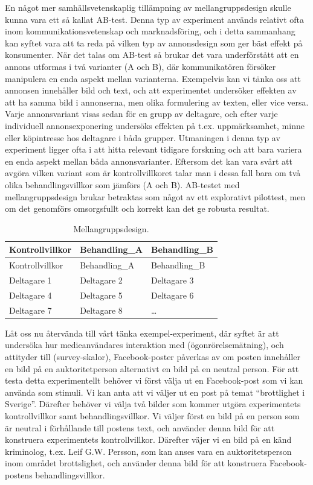 \documentclass[
]{book}
\begin{document}
En något mer samhällsvetenskaplig tillämpning av mellangruppsdesign skulle kunna vara ett så kallat AB-test. Denna typ av experiment används relativt ofta inom kommunikationsvetenskap och marknadsföring, och i detta sammanhang kan syftet vara att ta reda på vilken typ av annonsdesign som ger bäst effekt på konsumenter. När det talas om AB-test så brukar det vara underförstått att en annons utformas i två varianter (A och B), där kommunikatören försöker manipulera en enda aspekt mellan varianterna. Exempelvis kan vi tänka oss att annonsen innehåller bild och text, och att experimentet undersöker effekten av att ha samma bild i annonserna, men olika formulering av texten, eller vice versa. Varje annonsvariant visas sedan för en grupp av deltagare, och efter varje individuell annonsexponering undersöks effekten på t.ex. uppmärksamhet, minne eller köpintresse hos deltagare i båda grupper. Utmaningen i denna typ av experiment ligger ofta i att hitta relevant tidigare forskning och att bara variera en enda aspekt mellan båda annonsvarianter. Eftersom det kan vara svårt att avgöra vilken variant som är kontrollvillkoret talar man i dessa fall bara om två olika behandlingsvillkor som jämförs (A och B). AB-testet med mellangruppsdesign brukar betraktas som något av ett explorativt pilottest, men om det genomförs omsorgsfullt och korrekt kan det ge robusta resultat.

\begin{longtable}[]{@{}lll@{}}
\caption{\label{tab:tab-02-07-5-3-01}Mellangruppsdesign.}\tabularnewline
\toprule
Kontrollvillkor & Behandling\_A & Behandling\_B\tabularnewline
\midrule
\endfirsthead
\toprule
Kontrollvillkor & Behandling\_A & Behandling\_B\tabularnewline
\midrule
\endhead
Deltagare 1 & Deltagare 2 & Deltagare 3\tabularnewline
Deltagare 4 & Deltagare 5 & Deltagare 6\tabularnewline
Deltagare 7 & Deltagare 8 & \ldots{}\tabularnewline
\bottomrule
\end{longtable}

Låt oss nu återvända till vårt tänka exempel-experiment, där syftet är att undersöka hur medieanvändares interaktion med (ögonrörelsemätning), och attityder till (survey-skalor), Facebook-poster påverkas av om posten innehåller en bild på en auktoritetperson alternativt en bild på en neutral person. För att testa detta experimentellt behöver vi först välja ut en Facebook-post som vi kan använda som stimuli. Vi kan anta att vi väljer ut en post på temat ``brottlighet i Sverige''. Därefter behöver vi välja två bilder som kommer utgöra experimentets kontrollvillkor samt behandlingsvillkor. Vi väljer först en bild på en person som är neutral i förhållande till postens text, och använder denna bild för att konstruera experimentets kontrollvillkor. Därefter väjer vi en bild på en känd kriminolog, t.ex. Leif G.W. Persson, som kan anses vara en auktoritetsperson inom området brottslighet, och använder denna bild för att konstruera Facebook-postens behandlingsvillkor.
\end{document}

